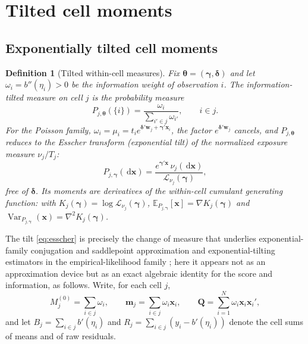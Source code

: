 \documentclass[11pt]{article}
\newtheorem{definition}{Definition}
\newcommand{\E}{\mathbb{E}}
\newcommand{\Var}{\operatorname{Var}}
\newcommand{\dd}{\,\mathrm{d}}
\newcommand{\bgamma}{\bm{\gamma}}
\newcommand{\bdelta}{\bm{\delta}}
\newcommand{\btheta}{\bm{\theta}}
\newcommand{\bx}{\mathbf{x}}
\newcommand{\bw}{\mathbf{w}}
\newcommand{\bQ}{\mathbf{Q}}
\begin{document}
\section{Tilted cell moments}\label{sec:tilted-main}

\subsection{Exponentially tilted cell moments}\label{sec:tilted-moments}

\begin{definition}[Tilted within-cell measures]\label{def:tilt}
Fix $\btheta = (\bgamma, \bdelta)$ and let $\omega_i =
b''(\eta_i) > 0$ be the information weight of observation $i$.  The
\emph{information-tilted measure} on cell $j$ is the probability measure
\[
P_{j,\btheta}(\{i\}) = \frac{\omega_i}{\sum_{i' \in j} \omega_{i'}},
\qquad i \in j .
\]
For the Poisson family, $\omega_i = \mu_i = t_i
e^{\bdelta'\bw_j + \bgamma'\bx_i}$, the factor $e^{\bdelta'\bw_j}$
cancels, and $P_{j,\btheta}$ reduces to the \emph{Esscher transform}
(exponential tilt) of the normalized exposure measure $\nu_j / T_j$:
\begin{equation}\label{eq:esscher}
P_{j,\bgamma}(\dd\bx)
 = \frac{e^{\bgamma'\bx}\,\nu_j(\dd\bx)}{\mathcal{L}_{\nu_j}(\bgamma)},
\end{equation}
free of $\bdelta$.  Its moments are derivatives of the within-cell
cumulant generating function: with
$K_j(\bgamma) = \log \mathcal{L}_{\nu_j}(\bgamma)$,
$\E_{P_{j,\bgamma}}[\bx] = \nabla K_j(\bgamma)$ and
$\Var_{P_{j,\bgamma}}(\bx) = \nabla^2 K_j(\bgamma)$.
\end{definition}

The tilt \eqref{eq:esscher} is precisely the change of measure that
underlies exponential-family conjugation and saddlepoint approximation
\citep{barndorff1978,daniels1954,jensen1995} and exponential-tilting
estimators in the empirical-likelihood family
\citep{efron1981,kitamura1997,owen2001,schennach2007}; here it appears not as an
approximation device but as an exact algebraic identity for the score and
information, as follows.  Write, for each cell $j$,
\begin{equation}\label{eq:moments}
M_j^{(0)} = \sum_{i \in j} \omega_i, \qquad
\mathbf{m}_j = \sum_{i \in j} \omega_i \bx_i, \qquad
\bQ = \sum_{i=1}^N \omega_i \bx_i \bx_i' ,
\end{equation}
and let $B_j = \sum_{i \in j} b'(\eta_i)$ and
$R_j = \sum_{i \in j} (y_i - b'(\eta_i))$ denote the cell sums of means
and of raw residuals.
\end{document}
